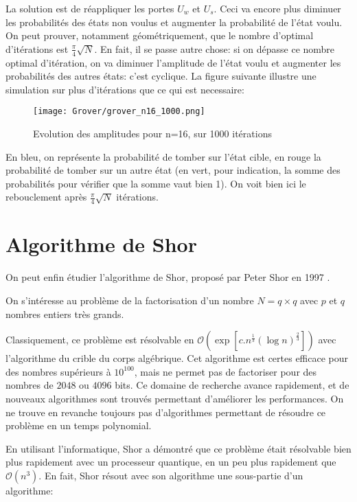 La solution est de réappliquer les portes $U_w$ et $U_s$. Ceci va encore plus diminuer les probabilités des états non voulus et augmenter la probabilité de l'état voulu.
On peut prouver, notamment géométriquement, que le nombre d'optimal d'itérations est $\frac{\pi}{4}\sqrt{N}$. En fait, il se passe autre chose: si on dépasse ce nombre optimal d'itération, on va diminuer l'amplitude de l'état voulu et augmenter les probabilités des autres états: c'est cyclique. La figure suivante illustre une simulation sur plus d'itérations que ce qui est necessaire:

\begin{figure}[htbp]
  \centering
  \texttt{[image: Grover/grover\_n16\_1000.png]}
  \caption{Evolution des amplitudes pour n=16, sur 1000 itérations}
\end{figure}

En bleu, on représente la probabilité de tomber sur l'état cible, en rouge la probabilité de tomber sur un autre état (en vert, pour indication, la somme des probabilités pour vérifier que la somme vaut bien 1). On voit bien ici le rebouclement après $\frac{\pi}{4}\sqrt{N}$ itérations.

\section{Algorithme de Shor}

On peut enfin étudier l'algorithme de Shor, proposé par Peter Shor en 1997 \cite{Shor97}.

\begin{pb}
  On s'intéresse au problème de la factorisation d'un nombre $N=q \times q$ avec $p$ et $q$ nombres entiers très grands.
\end{pb}

Classiquement, ce problème est résolvable en $\mathcal{O}(\exp{[c . n^{\frac{1}{3}} (\log n)^{\frac{2}{3}} ]})$ avec l'algorithme du crible du corps algébrique. Cet algorithme est certes efficace pour des nombres supérieurs à $10^{100}$, mais ne permet pas de factoriser pour des nombres de $2048$ ou $4096$ bits. Ce domaine de recherche avance rapidement, et de nouveaux algorithmes sont trouvés permettant d'améliorer les performances. On ne trouve en revanche toujours pas d'algorithmes permettant de résoudre ce problème en un temps polynomial.

En utilisant l'informatique, Shor a démontré que ce problème était résolvable bien plus rapidement avec un processeur quantique, en un peu plus rapidement que $\mathcal{O}(n^3)$. En fait, Shor résout avec son algorithme une sous-partie d'un algorithme:

